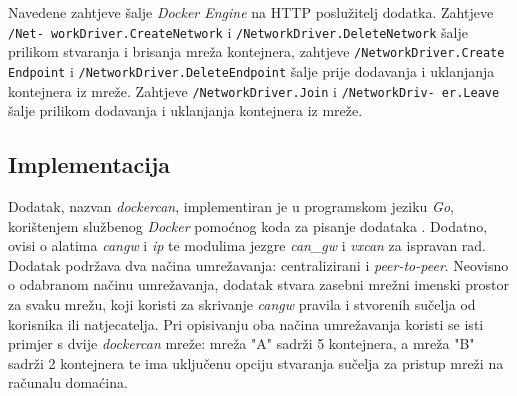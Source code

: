 \documentclass[times, utf8, diplomski, numeric]{fer}
\begin{document}
Navedene zahtjeve šalje \textit{Docker Engine} na HTTP poslužitelj dodatka. Zahtjeve \texttt{/Net- workDriver.CreateNetwork} i \texttt{/NetworkDriver.DeleteNetwork} šalje prilikom stvaranja i brisanja mreža kontejnera, zahtjeve \texttt{/NetworkDriver.Create Endpoint} i \texttt{/NetworkDriver.DeleteEndpoint} šalje prije dodavanja i uklanjanja kontejnera iz mreže. Zahtjeve \texttt{/NetworkDriver.Join} i \texttt{/NetworkDriv- er.Leave} šalje prilikom dodavanja i uklanjanja kontejnera iz mreže.

\subsection{Implementacija}
Dodatak, nazvan \textit{dockercan}, implementiran je u programskom jeziku \textit{Go}, korištenjem službenog \textit{Docker} pomoćnog koda za pisanje dodataka \cite{gohelpers}. Dodatno, ovisi o alatima \textit{cangw} i \textit{ip} te modulima jezgre \textit{can\_gw} i \textit{vxcan} za ispravan rad. Dodatak podržava dva načina umrežavanja: centralizirani i \textit{peer-to-peer}. Neovisno o odabranom načinu umrežavanja, dodatak stvara zasebni mrežni imenski prostor za svaku mrežu, koji koristi za skrivanje \textit{cangw} pravila i stvorenih sučelja od korisnika ili natjecatelja. Pri opisivanju oba načina umrežavanja koristi se isti primjer s dvije \textit{dockercan} mreže: mreža "A" sadrži 5 kontejnera, a mreža "B" sadrži 2 kontejnera te ima uključenu opciju stvaranja sučelja za pristup mreži na računalu domaćina. 
\end{document}
